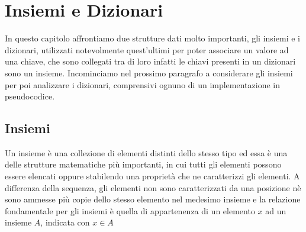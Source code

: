 \chapter{Insiemi e Dizionari}
In questo capitolo affrontiamo due strutture dati molto importanti, gli insiemi e i dizionari, utilizzati notevolmente quest'ultimi per poter associare un valore ad una chiave,
che sono collegati tra di loro infatti le chiavi presenti in un dizionari sono un insieme.\newline
Incominciamo nel prossimo paragrafo a considerare gli insiemi per poi analizzare i dizionari, comprensivi ognuno di un implementazione in pseudocodice.

\section{Insiemi}
Un insieme è una collezione di elementi distinti dello stesso tipo ed essa è una delle strutture matematiche più importanti, in cui tutti gli elementi possono 
essere elencati oppure stabilendo una proprietà che ne caratterizzi gli elementi.\newline
A differenza della sequenza, gli elementi non sono caratterizzati da una posizione nè sono ammesse più copie dello stesso elemento nel medesimo insieme
e la relazione fondamentale per gli insiemi è quella di appartenenza di un elemento $x$ ad un insieme $A$, indicata con $x \in A$
